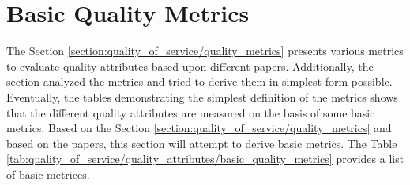 {{{{{{{\section{Basic Quality Metrics}{\label{section:quality_of_service/basic_quality_metrics}
The Section \ref{section:quality_of_service/quality_metrics} presents various metrics to evaluate quality attributes based upon different papers. Additionally, the section analyzed the metrics and tried to derive them in simplest form possible. Eventually, the tables demonstrating the simplest definition of the metrics shows that the different quality attributes are measured on the basis of some basic metrics. Based on the Section \ref{section:quality_of_service/quality_metrics} and based on the papers, this section will attempt to derive basic metrics. The Table \ref{tab:quality_of_service/quality_attributes/basic_quality_metrics} provides a list of basic metrices.
\\

}}}}}}}}
